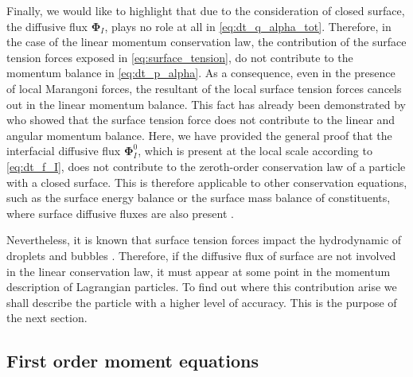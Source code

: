 Finally, we would like to highlight that  due to the consideration of closed surface, the diffusive flux $\mathbf{\Phi}_I$, plays no role at all in \ref{eq:dt_q_alpha_tot}.
Therefore, in the case of the linear momentum conservation law, the contribution of the surface tension forces exposed in \ref{eq:surface_tension}, do not contribute to the momentum balance in \ref{eq:dt_p_alpha}.
As a consequence, even in the presence of local Marangoni forces, the resultant of the local surface tension forces cancels out in the linear momentum balance.
This fact has already been demonstrated by \citet{hesla1993note} who showed that the surface tension force does not contribute to the linear and angular momentum balance. 
Here, we have provided the general proof that the interfacial diffusive flux $\mathbf{\Phi}_I^0$, which is present at the local scale according to \ref{eq:dt_f_I}, does not contribute to the zeroth-order conservation law of a particle with a closed surface.
This is therefore applicable to other conservation equations, such as the surface energy balance or the surface mass balance of constituents, where surface diffusive fluxes are also present \citep{bothe2022sharp,manikantan2020surfactant}. 

Nevertheless, it is known that surface tension forces impact the hydrodynamic of droplets and bubbles \citep{kentheswaran2022direct,pesci2018computational}. 
Therefore, if the diffusive flux of surface are not involved in the linear conservation law, it must appear at some point in the momentum description of Lagrangian particles. 
To find out where this contribution arise we shall describe the particle with a higher level of accuracy. 
This is the purpose of the next section. 

\subsection{First order moment equations}

